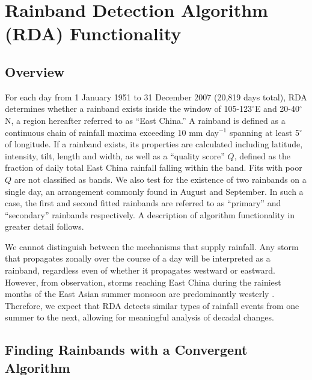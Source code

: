 \documentclass[9pt,twocolumn,twoside,lineno]{pnas-new}
\begin{document}
	 
\section{Rainband Detection Algorithm (RDA) Functionality}

\subsection{Overview}

	For each day from 1 January 1951 to 31 December 2007 (20,819 days total), RDA determines whether a rainband exists inside the window of 105-123$^{\circ}$E and 20-40$^{\circ}$N, a region hereafter referred to as ``East China.'' A rainband is defined as a continuous chain of rainfall maxima exceeding 10 mm day$^{-1}$ spanning at least 5$^{\circ}$ of longitude. If a rainband exists, its properties are calculated including latitude, intensity, tilt, length and width, as well as a ``quality score'' $Q$, defined as the fraction of daily total East China rainfall falling within the band. Fits with poor $Q$ are not classified as bands. We also test for the existence of two rainbands on a single day, an arrangement commonly found in August and September. In such a case, the first and second fitted rainbands are referred to as ``primary'' and ``secondary'' rainbands respectively. A description of algorithm functionality in greater detail follows.
	
	We cannot distinguish between the mechanisms that supply rainfall. Any storm that propagates zonally over the course of a day will be interpreted as a rainband, regardless even of whether it propagates westward or eastward. However, from observation, storms reaching East China during the rainiest months of the East Asian summer monsoon are predominantly westerly \citep{Day2015}. Therefore, we expect that RDA detects similar types of rainfall events from one summer to the next, allowing for meaningful analysis of decadal changes.  
	
\subsection*{Finding Rainbands with a Convergent Algorithm}
\end{document}

